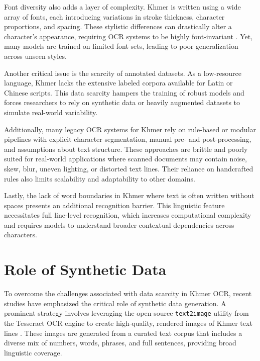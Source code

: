 Font diversity also adds a layer of complexity. Khmer is written using a wide array of fonts, each 
introducing variations in stroke thickness, character proportions, and spacing. These stylistic 
differences can drastically alter a character's appearance, requiring OCR systems to be highly 
font-invariant \citep{buoy2021seq2seq}. Yet, many models are trained on limited font sets, leading 
to poor generalization across unseen styles.

Another critical issue is the scarcity of annotated datasets. As a low-resource language, Khmer lacks 
the extensive labeled corpora available for Latin or Chinese scripts. This data scarcity hampers the 
training of robust models and forces researchers to rely on synthetic data or heavily augmented datasets 
to simulate real-world variability.

Additionally, many legacy OCR systems for Khmer rely on rule-based or modular pipelines with explicit 
character segmentation, manual pre- and post-processing, and assumptions about text structure. These 
approaches are brittle and poorly suited for real-world applications where scanned documents may contain 
noise, skew, blur, uneven lighting, or distorted text lines. Their reliance on handcrafted rules also 
limits scalability and adaptability to other domains.

Lastly, the lack of word boundaries in Khmer where text is often written without spaces presents an 
additional recognition barrier. This linguistic feature necessitates full line-level recognition, 
which increases computational complexity and requires models to understand broader contextual dependencies 
across characters.



\section{Role of Synthetic Data}
\label{sec:dl-models}

To overcome the challenges associated with data scarcity in Khmer OCR, 
recent studies have emphasized the critical role of synthetic data generation. A prominent 
strategy involves leveraging the open-source \texttt{text2image} utility from the Tesseract OCR 
engine to create high-quality, rendered images of Khmer text lines \citep{buoy2021seq2seq}. 
These images are generated from a curated text corpus that includes a diverse mix of numbers, 
words, phrases, and full sentences, providing broad linguistic coverage.

